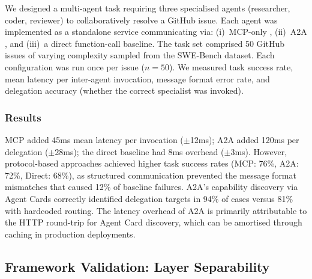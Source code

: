 \documentclass[review]{elsarticle}
\theoremstyle{definition}
\begin{document}
We designed a multi-agent task requiring three specialised agents (researcher, coder, reviewer) to collaboratively resolve a GitHub issue. Each agent was implemented as a standalone service communicating via: (i)~MCP-only \citep{anthropic2024mcp}, (ii)~A2A \citep{google2024a2a}, and (iii)~a direct function-call baseline. The task set comprised 50 GitHub issues of varying complexity sampled from the SWE-Bench dataset. Each configuration was run once per issue ($n=50$). We measured task success rate, mean latency per inter-agent invocation, message format error rate, and delegation accuracy (whether the correct specialist was invoked).

\subsubsection{Results}

MCP added 45ms mean latency per invocation ($\pm$12ms); A2A added 120ms per delegation ($\pm$28ms); the direct baseline had 8ms overhead ($\pm$3ms). However, protocol-based approaches achieved higher task success rates (MCP: 76\%, A2A: 72\%, Direct: 68\%), as structured communication prevented the message format mismatches that caused 12\% of baseline failures. A2A's capability discovery via Agent Cards correctly identified delegation targets in 94\% of cases versus 81\% with hardcoded routing. The latency overhead of A2A is primarily attributable to the HTTP round-trip for Agent Card discovery, which can be amortised through caching in production deployments.

\subsection{Framework Validation: Layer Separability}\label{sec:validation}
\end{document}
